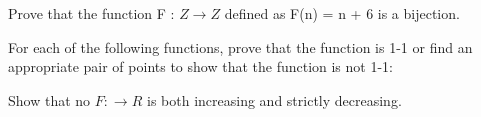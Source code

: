 \documentclass{exam}
\begin{document}
\begin{questions}


\question Prove that the function F : $Z \rightarrow Z$ defined as F(n) = n + 6 is a bijection.
\vspace{4in}



\question For each of the following functions, prove that the function is 1-1 or find an appropriate pair of points to show that the function is not 1-1:



\question Show that no $F : \rightarrow R$ is both increasing and strictly decreasing.

\vspace{9in}


\end{questions}
\end{document}
